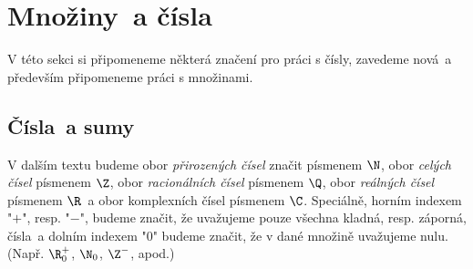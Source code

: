 \section{Množiny~a čísla}\label{sec:mnoziny_a_cisla}

V této sekci si připomeneme některá značení pro práci s čísly, zavedeme nová~a především připomeneme práci s množinami.

\subsection{Čísla~a sumy}

\begin{convention}
    V dalším textu budeme obor \emph{přirozených čísel} značit písmenem $\N$, obor \emph{celých čísel} písmenem $\Z$, obor \emph{racionálních čísel} písmenem $\Q$, obor \emph{reálných čísel} písmenem $\R$~a obor komplexních čísel písmenem $\C$. Speciálně, horním indexem "$+$", resp. "$-$", budeme značit, že uvažujeme pouze všechna kladná, resp. záporná, čísla~a dolním indexem "$0$" budeme značit, že v dané množině uvažujeme nulu. (Např. $\R_0^+$, $\N_0$, $\Z^-$, apod.) 
\end{convention}

